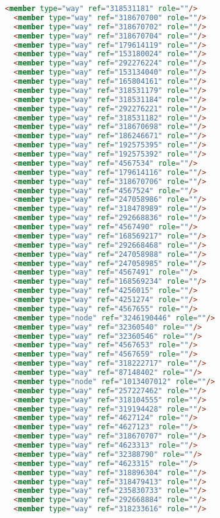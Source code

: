 \begin{lstlisting}[language=HTML,basicstyle=\tiny,caption=bandung1.xml]
  <member type="way" ref="318531181" role=""/>
  <member type="way" ref="318670700" role=""/>
  <member type="way" ref="318670702" role=""/>
  <member type="way" ref="318670704" role=""/>
  <member type="way" ref="179614119" role=""/>
  <member type="way" ref="153180024" role=""/>
  <member type="way" ref="292276224" role=""/>
  <member type="way" ref="153134040" role=""/>
  <member type="way" ref="165804161" role=""/>
  <member type="way" ref="318531179" role=""/>
  <member type="way" ref="318531184" role=""/>
  <member type="way" ref="292276221" role=""/>
  <member type="way" ref="318531182" role=""/>
  <member type="way" ref="318670698" role=""/>
  <member type="way" ref="186246671" role=""/>
  <member type="way" ref="192575395" role=""/>
  <member type="way" ref="192575392" role=""/>
  <member type="way" ref="4567534" role=""/>
  <member type="way" ref="179614116" role=""/>
  <member type="way" ref="318670706" role=""/>
  <member type="way" ref="4567524" role=""/>
  <member type="way" ref="247058986" role=""/>
  <member type="way" ref="318478989" role=""/>
  <member type="way" ref="292668836" role=""/>
  <member type="way" ref="4567490" role=""/>
  <member type="way" ref="168569217" role=""/>
  <member type="way" ref="292668468" role=""/>
  <member type="way" ref="247058988" role=""/>
  <member type="way" ref="247058985" role=""/>
  <member type="way" ref="4567491" role=""/>
  <member type="way" ref="168569234" role=""/>
  <member type="way" ref="4256015" role=""/>
  <member type="way" ref="4251274" role=""/>
  <member type="way" ref="4567655" role=""/>
  <member type="node" ref="3246190446" role=""/>
  <member type="way" ref="32360540" role=""/>
  <member type="way" ref="32360546" role=""/>
  <member type="way" ref="4567653" role=""/>
  <member type="way" ref="4567659" role=""/>
  <member type="way" ref="318222717" role=""/>
  <member type="way" ref="87148402" role=""/>
  <member type="node" ref="1013407012" role=""/>
  <member type="way" ref="257227462" role=""/>
  <member type="way" ref="318104555" role=""/>
  <member type="way" ref="319194428" role=""/>
  <member type="way" ref="4627124" role=""/>
  <member type="way" ref="4627123" role=""/>
  <member type="way" ref="318670707" role=""/>
  <member type="way" ref="4623313" role=""/>
  <member type="way" ref="32388790" role=""/>
  <member type="way" ref="4623315" role=""/>
  <member type="way" ref="318896304" role=""/>
  <member type="way" ref="318479413" role=""/>
  <member type="way" ref="235830733" role=""/>
  <member type="way" ref="292668884" role=""/>
  <member type="way" ref="318233616" role=""/>

\end{lstlisting}
